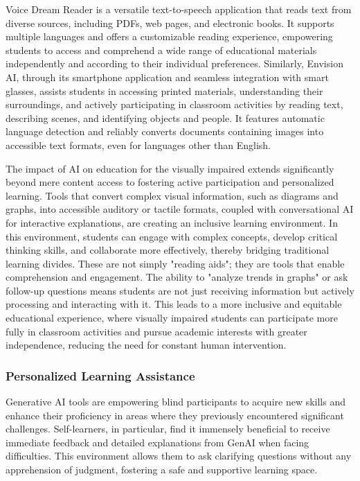 Voice Dream Reader is a versatile text-to-speech application that reads text from diverse sources, including PDFs, web pages, and electronic books. It supports multiple languages and offers a customizable reading experience, empowering students to access and comprehend a wide range of educational materials independently and according to their individual preferences. \cite{victastudents2024} Similarly, Envision AI, through its smartphone application and seamless integration with smart glasses, assists students in accessing printed materials, understanding their surroundings, and actively participating in classroom activities by reading text, describing scenes, and identifying objects and people. It features automatic language detection and reliably converts documents containing images into accessible text formats, even for languages other than English. \cite{victastudents2024}

The impact of AI on education for the visually impaired extends significantly beyond mere content access to fostering active participation and personalized learning. Tools that convert complex visual information, such as diagrams and graphs, into accessible auditory or tactile formats, coupled with conversational AI for interactive explanations, are creating an inclusive learning environment. In this environment, students can engage with complex concepts, develop critical thinking skills, and collaborate more effectively, thereby bridging traditional learning divides. These are not simply "reading aids"; they are tools that enable comprehension and engagement. The ability to "analyze trends in graphs" \cite{victastudents2024} or ask follow-up questions \cite{victastudents2024} means students are not just receiving information but actively processing and interacting with it. This leads to a more inclusive and equitable educational experience, where visually impaired students can participate more fully in classroom activities and pursue academic interests with greater independence, reducing the need for constant human intervention.

\subsubsection{Personalized Learning Assistance}

Generative AI tools are empowering blind participants to acquire new skills and enhance their proficiency in areas where they previously encountered significant challenges. Self-learners, in particular, find it immensely beneficial to receive immediate feedback and detailed explanations from GenAI when facing difficulties. This environment allows them to ask clarifying questions without any apprehension of judgment, fostering a safe and supportive learning space. \cite{maitraye2024}

